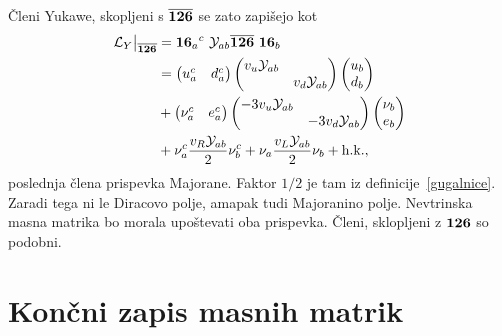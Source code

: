 Členi Yukawe, skopljeni s $\overline{\mathbf{126}}$ se zato zapišejo kot
\begin{align}
	\mathcal{L}_Y\big|_{\repb{126}} &= \rep{16}_a{}^c\ \mathcal{Y}_{ab} \repb{126}\ \rep{16}_b \notag \\
	&= \begin{pmatrix}
		u_a^c & d_a^c
	\end{pmatrix} \begin{pmatrix}
		v_u \mathcal{Y}_{ab} & \\ & v_d \mathcal{Y}_{ab}
	\end{pmatrix} \begin{pmatrix}
		u_b \\ d_b
	\end{pmatrix} \notag \\
	&+ \begin{pmatrix}
		\nu_a^c & e_a^c
	\end{pmatrix} \begin{pmatrix}
		-3 v_u\mathcal{Y}_{ab} & \\ & -3 v_d \mathcal{Y}_{ab}
	\end{pmatrix} \begin{pmatrix}
		\nu_b \\ e_b
	\end{pmatrix} \notag \\
	&+ \nu_a^c\frac{v_R \mathcal{Y}_{ab}}{2}\nu_b^c + \nu_a \frac{v_L \mathcal{Y}_{ab}}{2} \nu_b +
	\text{h.k.},
	\label{126bar}
\end{align}
poslednja člena prispevka Majorane. Faktor $1/2$ je tam iz definicije~\eqref{gugalnice}. Zaradi tega
ni le Diracovo polje, amapak tudi Majoranino polje. Nevtrinska masna matrika bo morala upoštevati
oba prispevka. Členi, sklopljeni z $\mathbf{126}$ so podobni.

\section{Končni zapis masnih matrik}

